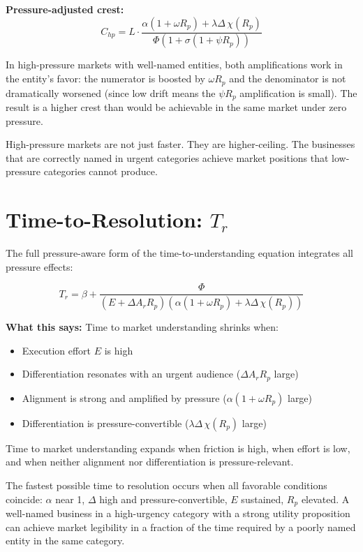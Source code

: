 \documentclass[12pt, openany]{book}
\theoremstyle{thmstyle}
\theoremstyle{defstyle}
\begin{document}
\textbf{Pressure-adjusted crest:}
\begin{equation}
C_{hp} = L \cdot \frac{\alpha(1+\omega R_p) + \lambda\Delta\,\chi(R_p)}{\Phi(1 + \sigma(1+\psi R_p))}
\label{eq:pressure_crest}
\end{equation}

In high-pressure markets with well-named entities, both amplifications work in the entity's favor: the numerator is boosted by $\omega R_p$ and the denominator is not dramatically worsened (since low drift means the $\psi R_p$ amplification is small). The result is a higher crest than would be achievable in the same market under zero pressure.

High-pressure markets are not just faster. They are higher-ceiling. The businesses that are correctly named in urgent categories achieve market positions that low-pressure categories cannot produce.

\section{Time-to-Resolution: $T_r$}

The full pressure-aware form of the time-to-understanding equation integrates all pressure effects:

\begin{equation}
T_r = \beta + \frac{\Phi}{(E + \Delta A_r R_p)\left(\alpha(1+\omega R_p) + \lambda\Delta\,\chi(R_p)\right)}
\label{eq:time_resolution}
\end{equation}

\textbf{What this says:} Time to market understanding shrinks when:
\begin{itemize}[leftmargin=1.5em]
  \item Execution effort $E$ is high
  \item Differentiation resonates with an urgent audience ($\Delta A_r R_p$ large)
  \item Alignment is strong and amplified by pressure ($\alpha(1 + \omega R_p)$ large)
  \item Differentiation is pressure-convertible ($\lambda\Delta\,\chi(R_p)$ large)
\end{itemize}

Time to market understanding expands when friction is high, when effort is low, and when neither alignment nor differentiation is pressure-relevant.

The fastest possible time to resolution occurs when all favorable conditions coincide: $\alpha$ near 1, $\Delta$ high and pressure-convertible, $E$ sustained, $R_p$ elevated. A well-named business in a high-urgency category with a strong utility proposition can achieve market legibility in a fraction of the time required by a poorly named entity in the same category.
\end{document}
